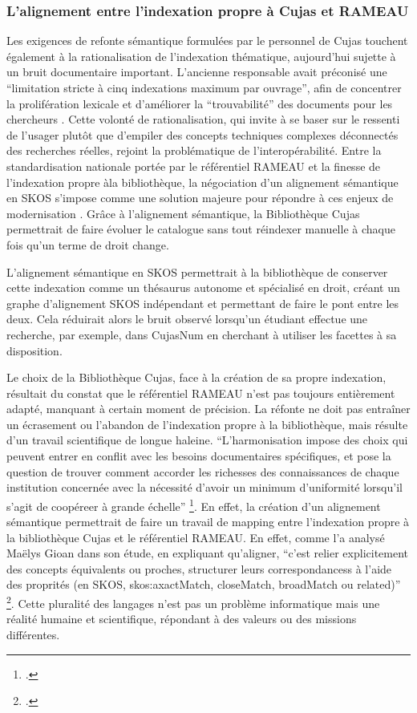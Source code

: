 \subsubsection{L'alignement entre l'indexation propre à Cujas et RAMEAU}
Les exigences de refonte sémantique formulées par le personnel de Cujas touchent également à la rationalisation de l'indexation thématique, aujourd'hui sujette à un bruit documentaire important. L'ancienne responsable avait préconisé une \enquote{limitation stricte à cinq indexations maximum par ouvrage}, afin de concentrer la prolifération lexicale et d'améliorer la \enquote{trouvabilité} des documents pour les chercheurs  . Cette volonté de rationalisation, qui invite à se baser sur le ressenti de l'usager plutôt que d'empiler des concepts techniques complexes déconnectés des recherches réelles, rejoint la problématique de l'interopérabilité. Entre la standardisation nationale portée par le référentiel \ac{RAMEAU} et la finesse de l'indexation propre àla bibliothèque, la négociation d'un alignement sémantique en \ac{SKOS} s'impose comme une solution majeure pour répondre à ces enjeux de modernisation . Grâce à l'alignement sémantique, la Bibliothèque Cujas permettrait de faire évoluer le catalogue sans tout réindexer manuelle à chaque fois qu'un terme de droit change. 

L'alignement sémantique en \ac{SKOS} permettrait à la bibliothèque de conserver cette indexation comme un thésaurus autonome et spécialisé en droit, créant un graphe d'alignement \ac{SKOS} indépendant et permettant de faire le pont entre les deux. Cela réduirait alors le bruit observé lorsqu'un étudiant effectue une recherche, par exemple, dans CujasNum en cherchant à utiliser les facettes à sa disposition. 

Le choix de la Bibliothèque Cujas, face à la création de sa propre indexation, résultait du constat que le référentiel \ac{RAMEAU} n'est pas toujours entièrement adapté, manquant à certain moment de précision. La réfonte ne doit pas entraîner un écrasement ou l'abandon de l'indexation propre à la bibliothèque, mais résulte d'un travail scientifique de longue haleine. \enquote{L'harmonisation impose des choix qui peuvent entrer en conflit avec les besoins documentaires spécifiques, et pose la question de trouver comment accorder les richesses des connaissances de chaque institution concernée avec la nécessité d'avoir un minimum d'uniformité lorsqu'il s'agit de coopéreer à grande échelle} \footcite{gioanGestionLinformationLere}. En effet, la création d'un alignement sémantique permettrait de faire un travail de mapping entre l'indexation propre à la bibliothèque Cujas et le référentiel \ac{RAMEAU}. En effet, comme l'a analysé Maëlys Gioan dans son étude, en expliquant qu'aligner, \enquote{c'est relier explicitement des concepts équivalents ou proches, structurer leurs correspondancess à l'aide des proprités (en \ac{SKOS}, skos:axactMatch, closeMatch, broadMatch ou related)} \footcite{gioanGestionLinformationLere}. Cette pluralité des langages n'est pas un problème informatique mais une réalité humaine et scientifique, répondant à des valeurs ou des missions différentes.


